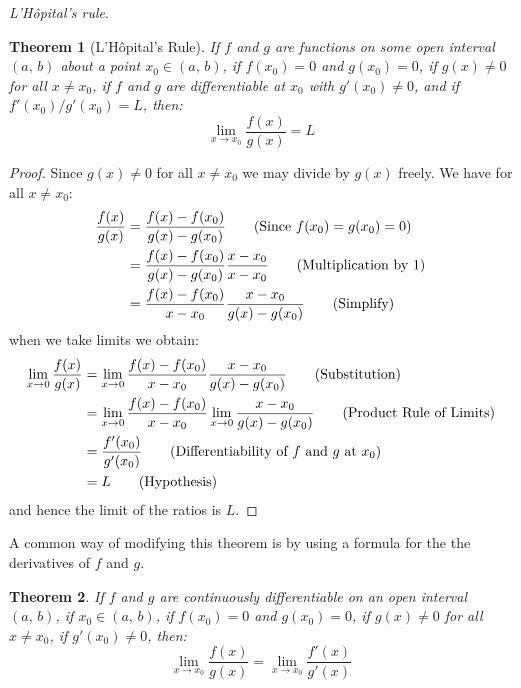 \documentclass{article}
\theoremstyle{plain}
\newtheorem{theorem}{Theorem}
\begin{document}
    \textit{L'H\^{o}pital's rule}.
    \begin{theorem}[L'H\^{o}pital's Rule]
        If $f$ and $g$ are functions on some open interval $(a,\,b)$ about a
        point $x_{0}\in(a,\,b)$, if $f(x_{0})=0$ and $g(x_{0})=0$, if
        $g(x)\ne{0}$ for all $x\ne{x}_{0}$, if
        $f$ and $g$ are differentiable at $x_{0}$ with
        $g'(x_{0})\ne{0}$, and if $f'(x_{0})/g'(x_{0})=L$, then:
        \begin{equation}
            \lim_{x\rightarrow{x_{0}}}\frac{f(x)}{g(x)}=L
        \end{equation}
    \end{theorem}
    \begin{proof}
        Since $g(x)\ne{0}$ for all $x\ne{x}_{0}$ we may divide by $g(x)$ freely.
        We have for all $x\ne{x}_{0}$:
        \begin{align}
            \frac{f(x)}{g(x)}
                &=\frac{f(x)-f(x_{0})}{g(x)-g(x_{0})}
                    \tag{Since $f(x_{0})=g(x_{0})=0$}\\
                &=\frac{f(x)-f(x_{0})}{g(x)-g(x_{0})}
                    \frac{x-x_{0}}{x-x_{0}}
                        \tag{Multiplication by 1}\\
                &=\frac{f(x)-f(x_{0})}{x-x_{0}}
                    \frac{x-x_{0}}{g(x)-g(x_{0})}
                        \tag{Simplify}
        \end{align}
        when we take limits we obtain:
        \begin{align}
            \lim_{x\rightarrow{0}}\frac{f(x)}{g(x)}
                &=\lim_{x\rightarrow{0}}\frac{f(x)-f(x_{0})}{x-x_{0}}
                    \frac{x-x_{0}}{g(x)-g(x_{0})}
                        \tag{Substitution}\\
                &=\lim_{x\rightarrow{0}}\frac{f(x)-f(x_{0})}{x-x_{0}}
                    \lim_{x\rightarrow{0}}\frac{x-x_{0}}{g(x)-g(x_{0})}
                        \tag{Product Rule of Limits}\\
                &=\frac{f'(x_{0})}{g'(x_{0})}
                    \tag{Differentiability of $f$ and $g$ at $x_{0}$}\\
                &=L
                    \tag{Hypothesis}
        \end{align}
        and hence the limit of the ratios is $L$.
    \end{proof}
    A common way of modifying this theorem is by using a formula for the the
    derivatives of $f$ and $g$.
    \begin{theorem}
        If $f$ and $g$ are continuously differentiable on an open interval
        $(a,\,b)$, if $x_{0}\in(a,\,b)$, if $f(x_{0})=0$ and $g(x_{0})=0$,
        if $g(x)\ne{0}$ for all $x\ne{x}_{0}$, if $g'(x_{0})\ne{0}$, then:
        \begin{equation}
            \lim_{x\rightarrow{x}_{0}}\frac{f(x)}{g(x)}
                =\lim_{x\rightarrow{x}_{0}}\frac{f'(x)}{g'(x)}
        \end{equation}
    \end{theorem}
\end{document}
